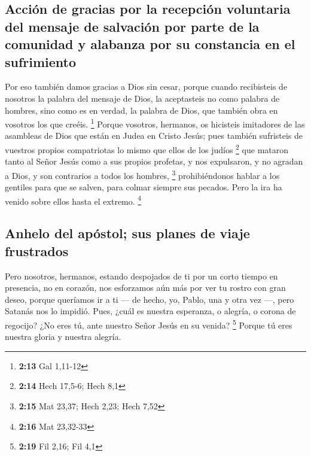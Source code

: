 \hypertarget{acciuxf3n-de-gracias-por-la-recepciuxf3n-voluntaria-del-mensaje-de-salvaciuxf3n-por-parte-de-la-comunidad-y-alabanza-por-su-constancia-en-el-sufrimiento}{%
\subsection{Acción de gracias por la recepción voluntaria del mensaje de
salvación por parte de la comunidad y alabanza por su constancia en el
sufrimiento}\label{acciuxf3n-de-gracias-por-la-recepciuxf3n-voluntaria-del-mensaje-de-salvaciuxf3n-por-parte-de-la-comunidad-y-alabanza-por-su-constancia-en-el-sufrimiento}}

 Por eso también damos gracias a Dios sin cesar, porque
cuando recibisteis de nosotros la palabra del mensaje de Dios, la
aceptasteis no como palabra de hombres, sino como es en verdad, la
palabra de Dios, que también obra en vosotros los que creéis.
\footnote{\textbf{2:13} Gal 1,11-12}  Porque vosotros,
hermanos, os hicisteis imitadores de las asambleas de Dios que están en
Judea en Cristo Jesús; pues también sufristeis de vuestros propios
compatriotas lo mismo que ellos de los judíos \footnote{\textbf{2:14}
  Hech 17,5-6; Hech 8,1}  que mataron tanto al Señor
Jesús como a sus propios profetas, y nos expulsaron, y no agradan a
Dios, y son contrarios a todos los hombres, \footnote{\textbf{2:15} Mat
  23,37; Hech 2,23; Hech 7,52}  prohibiéndonos hablar a
los gentiles para que se salven, para colmar siempre sus pecados. Pero
la ira ha venido sobre ellos hasta el extremo. \footnote{\textbf{2:16}
  Mat 23,32-33}

\hypertarget{anhelo-del-apuxf3stol-sus-planes-de-viaje-frustrados}{%
\subsection{Anhelo del apóstol; sus planes de viaje
frustrados}\label{anhelo-del-apuxf3stol-sus-planes-de-viaje-frustrados}}

 Pero nosotros, hermanos, estando despojados de ti por un
corto tiempo en presencia, no en corazón, nos esforzamos aún más por ver
tu rostro con gran deseo,  porque queríamos ir a ti ---
de hecho, yo, Pablo, una y otra vez ---, pero Satanás nos lo impidió.
 Pues, ¿cuál es nuestra esperanza, o alegría, o corona de
regocijo? ¿No eres tú, ante nuestro Señor Jesús en su venida?
\footnote{\textbf{2:19} Fil 2,16; Fil 4,1}  Porque tú
eres nuestra gloria y nuestra alegría.

